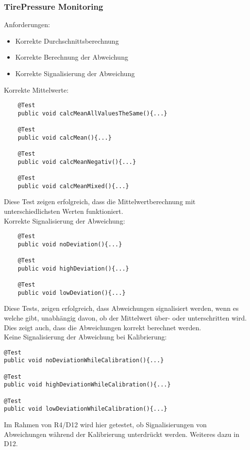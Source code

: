 \subsubsection{TirePressure Monitoring}
Anforderungen:
\begin{itemize}
	\item Korrekte Durchschnittsberechnung
	\item Korrekte Berechnung der Abweichung
	\item Korrekte Signalisierung der Abweichung
\end{itemize}

Korrekte Mittelwerte:
\begin{lstlisting}
	@Test
    public void calcMeanAllValuesTheSame(){...}
    
    @Test
    public void calcMean(){...}
    
    @Test
    public void calcMeanNegativ(){...}
    
    @Test
    public void calcMeanMixed(){...}
\end{lstlisting}
Diese Test zeigen erfolgreich, dass die Mittelwertberechnung mit unterschiedlichsten Werten funktioniert.\\

Korrekte Signalisierung der Abweichung:
\begin{lstlisting}
	@Test
	public void noDeviation(){...}
	
	@Test
	public void highDeviation(){...}
	
	@Test
	public void lowDeviation(){...}
\end{lstlisting}
Diese Tests, zeigen erfolgreich, dass Abweichungen signalisiert werden, wenn es welche gibt, unabhängig davon, ob der Mittelwert über- oder unterschritten wird. Dies zeigt auch, dass die Abweichungen korrekt berechnet werden.\\

Keine Signalisierung der Abweichung bei Kalibrierung:
\begin{lstlisting}
@Test
public void noDeviationWhileCalibration(){...}

@Test
public void highDeviationWhileCalibration(){...}

@Test
public void lowDeviationWhileCalibration(){...}
\end{lstlisting}Im Rahmen von R4/D12 wird hier getestet, ob Signalisierungen von Abweichungen während der Kalibrierung unterdrückt werden. Weiteres dazu in D12.

